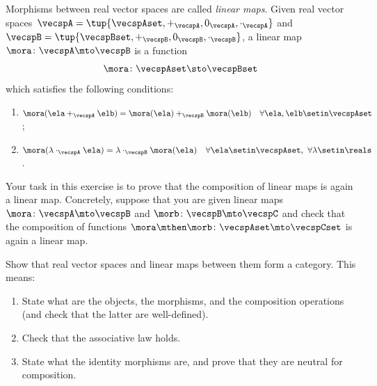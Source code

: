 
\begin{gradedexercise}
    \label{ex:linear-maps}

    Morphisms between real vector spaces are called \emph{linear maps}.
    Given real vector spaces~$\vecspA = \tup{\vecspAset, +_{\vecspA}, 0_{\vecspA}, \cdot_{\vecspA}}$ and $\vecspB = \tup{\vecspBset, +_{\vecspB}, 0_{\vecspB}, \cdot_{\vecspB}}$, a linear map $\mora \colon \vecspA \mto \vecspB$ is a function
    \begin{equation}
        \mora \colon \vecspAset \sto \vecspBset
    \end{equation}
    which satisfies the following conditions:
    \begin{enumerate}
        \item $\mora(\ela +_{\vecspA} \elb) = \mora(\ela) +_{\vecspB} \mora(\elb) \quad \forall \ela, \elb \setin \vecspAset$;
        \item $\mora(\lambda \cdot_{\vecspA} \ela) = \lambda \cdot_{\vecspB} \mora(\ela) \quad \forall \ela \setin \vecspAset, \ \forall \lambda \setin \reals$.
    \end{enumerate}

    Your task in this exercise is to prove that the composition of linear maps is again a linear map.
    Concretely, suppose that you are given linear maps $\mora \colon \vecspA \mto \vecspB$ and $\morb \colon \vecspB \mto \vecspC$ and check that the composition of functions $\mora \mthen \morb \colon \vecspAset \mto \vecspCset$ is again a linear map.

\end{gradedexercise}


\begin{gradedexercise}
    \label{ex:category-real-vect}

    Show that real vector spaces and linear maps between them form a category.
    This means:
    \begin{enumerate}
        \item State what are the objects, the morphisms, and the composition operations (and check that the latter are well-defined).
        \item Check that the associative law holds.
        \item State what the identity morphisms are, and prove that they are neutral for composition.
    \end{enumerate}

\end{gradedexercise}

